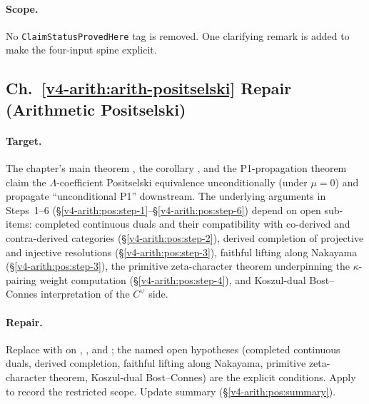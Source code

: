 \paragraph{Scope.} No \texttt{ClaimStatusProvedHere} tag is removed.
One clarifying remark is added to make the four-input spine explicit.

\subsection{Ch.~\ref{v4-arith:arith-positselski} Repair (Arithmetic Positselski)}
\label{v4-arith:w3-audit-B:repair-25}

\paragraph{Target.} The chapter's main theorem
, the corollary
, and the P1-propagation
theorem  claim the
\(\Lambda\)-coefficient Positselski equivalence unconditionally (under
\(\mu=0\)) and propagate ``unconditional P1'' downstream. The
underlying arguments in Steps~1--6
(\S\ref{v4-arith:pos:step-1}--\S\ref{v4-arith:pos:step-6}) depend
on open sub-items: completed continuous duals and their compatibility
with co-derived and contra-derived categories
(\S\ref{v4-arith:pos:step-2}), derived completion of projective
and injective resolutions (\S\ref{v4-arith:pos:step-3}), faithful
lifting along Nakayama (\S\ref{v4-arith:pos:step-3}), the primitive
zeta-character theorem underpinning the \(\kappa\)-pairing weight
computation (\S\ref{v4-arith:pos:step-4}), and Koszul-dual
Bost--Connes interpretation of the \(C^{\vee}\) side.

\paragraph{Repair.} Replace \ClaimStatusProvedHere{} with
\ClaimStatusProvedHereConditional{} on
,
, and
; the named open
hypotheses (completed continuous duals, derived completion, faithful
lifting along Nakayama, primitive zeta-character theorem,
Koszul-dual Bost--Connes) are the explicit conditions.
Apply 
to record the restricted scope. Update summary
(\S\ref{v4-arith:pos:summary}).

